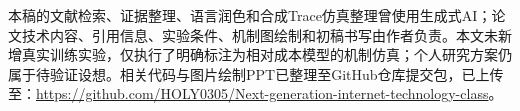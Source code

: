 \par\vspace{2mm}
\par
{}
{\small
本稿的文献检索、证据整理、语言润色和合成Trace仿真整理曾使用生成式AI；论文技术内容、引用信息、实验条件、机制图绘制和初稿书写由作者负责。本文未新增真实训练实验，仅执行了明确标注为相对成本模型的机制仿真；个人研究方案仍属于待验证设想。相关代码与图片绘制PPT已整理至GitHub仓库提交包，已上传至：\url{https://github.com/HOLY0305/Next-generation-internet-technology-class}。
\par}
